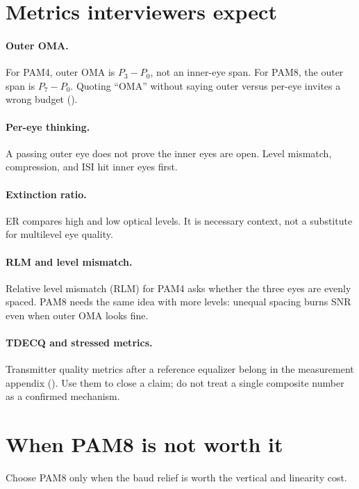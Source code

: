 \section{Metrics interviewers expect}
\label{sec:multilevel-metrics}

\paragraph{Outer OMA.}
For PAM4, outer OMA is \(P_3-P_0\), not an inner-eye span. For PAM8, the outer
span is \(P_7-P_0\). Quoting ``OMA'' without saying outer versus per-eye invites
a wrong budget ().

\paragraph{Per-eye thinking.}
A passing outer eye does not prove the inner eyes are open. Level mismatch,
compression, and ISI hit inner eyes first.

\paragraph{Extinction ratio.}
ER compares high and low optical levels. It is necessary context, not a
substitute for multilevel eye quality.

\paragraph{RLM and level mismatch.}
Relative level mismatch (RLM) for PAM4 asks whether the three eyes are evenly
spaced. PAM8 needs the same idea with more levels: unequal spacing burns SNR
even when outer OMA looks fine.

\paragraph{TDECQ and stressed metrics.}
Transmitter quality metrics after a reference equalizer belong in the
measurement appendix (). Use them to close a claim; do not treat
a single composite number as a confirmed mechanism.

\section{When PAM8 is not worth it}
\label{sec:pam8-not-worth}

Choose PAM8 only when the baud relief is worth the vertical and linearity cost.

